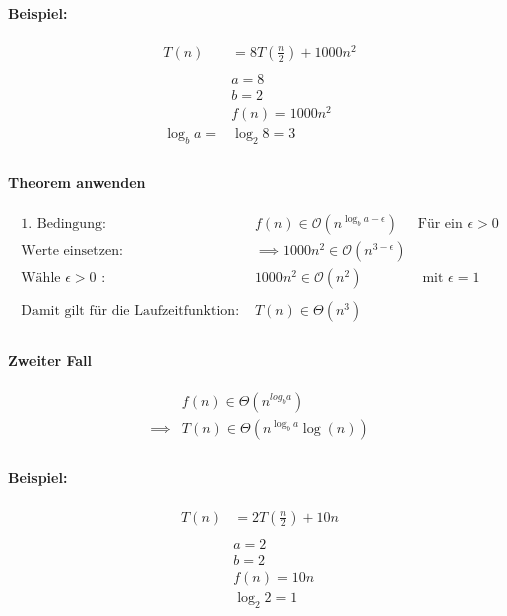 \documentclass[a4paper]{scrartcl}
\begin{document}
	\paragraph{Beispiel:}
	\begin{align*}
		T(n)  &= 8T(\frac{n}{2}) +1000n^2 \\
		\\
		&a =8\\
		&b = 2\\
		&f(n) = 1000n^2\\
		\log _b a=  &\log_2 8 = 3\\
	\end{align*}
	
	\paragraph{Theorem anwenden}
	\begin{align*}
		\text{1. Bedingung: } &f(n) \in \mathcal{O}(n^{\log_b a- \epsilon})& \text{Für ein }  \epsilon > 0\\
		\text{Werte einsetzen: } &\implies 1000n^2 \in \mathcal{O}(n^{3 - \epsilon})\\
		\text{Wähle \(\epsilon > 0\) : }  & 1000n^2 \in \mathcal{O}(n^2)& \text{ mit } \epsilon = 1\\
		\\
		\text{Damit gilt für die Laufzeitfunktion: } &T(n) \in \Theta(n^3)\\ 
	\end{align*}

	\newpage
	\paragraph{Zweiter Fall}
	\begin{align*}
	&f(n) \in \Theta(n^{log_b a}) \\
	\implies& T(n) \in \Theta(n^{\log_b a} \log (n))\\
	\end{align*}
	
	\paragraph{Beispiel:}
	\begin{align*}
	T(n)  &= 2T(\frac{n}{2}) +10n \\
	\\
	&a =2\\
	&b = 2\\
	&f(n) = 10n\\
	&\log_2 2 = 1\\
	\end{align*}
	
\end{document}
